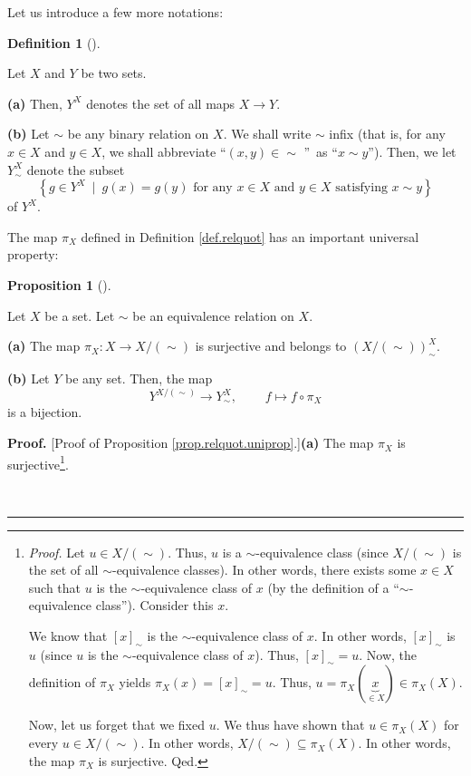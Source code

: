 \documentclass[numbers=enddot,12pt,final,onecolumn,notitlepage]{scrartcl}%
\theoremstyle{definition}
\newtheorem{prop}[theo]{Proposition}
\newenvironment{proposition}[1][]
{\begin{prop}[#1]\begin{leftbar}}
{\end{leftbar}\end{prop}}
\newtheorem{defi}[theo]{Definition}
\newenvironment{definition}[1][]
{\begin{defi}[#1]\begin{leftbar}}
{\end{leftbar}\end{defi}}
\newenvironment{proof}[1][Proof]{\noindent\textbf{#1.} }{\ \rule{0.5em}{0.5em}}
\newenvironment{verlong}{}{}
\begin{document}
\begin{verlong}
Let us introduce a few more notations:

\begin{definition}
\label{def.relquot.maps}Let $X$ and $Y$ be two sets.

\textbf{(a)} Then, $Y^{X}$ denotes the set of all maps $X\rightarrow Y$.

\textbf{(b)} Let $\sim$ be any binary relation on $X$. We shall write $\sim$
infix (that is, for any $x\in X$ and $y\in X$, we shall abbreviate
\textquotedblleft$\left(  x,y\right)  \in\left.  \sim\right.  $%
\textquotedblright\ as \textquotedblleft$x\sim y$\textquotedblright). Then, we
let $Y_{\sim}^{X}$ denote the subset%
\[
\left\{  g\in Y^{X}\ \mid\ g\left(  x\right)  =g\left(  y\right)  \text{ for
any }x\in X\text{ and }y\in X\text{ satisfying }x\sim y\right\}
\]
of $Y^{X}$.
\end{definition}

The map $\pi_{X}$ defined in Definition \ref{def.relquot} has an important
universal property:

\begin{proposition}
\label{prop.relquot.uniprop}Let $X$ be a set. Let $\sim$ be an equivalence
relation on $X$.

\textbf{(a)} The map $\pi_{X}:X\rightarrow X/\left(  \sim\right)  $ is
surjective and belongs to $\left(  X/\left(  \sim\right)  \right)  _{\sim}%
^{X}$.

\textbf{(b)} Let $Y$ be any set. Then, the map%
\[
Y^{X/\left(  \sim\right)  }\rightarrow Y_{\sim}^{X}%
,\ \ \ \ \ \ \ \ \ \ f\mapsto f\circ\pi_{X}%
\]
is a bijection.
\end{proposition}

\begin{proof}
[Proof of Proposition \ref{prop.relquot.uniprop}.]\textbf{(a)} The map
$\pi_{X}$ is surjective\footnote{\textit{Proof.} Let $u\in X/\left(
\sim\right)  $. Thus, $u$ is a $\sim$-equivalence class (since $X/\left(
\sim\right)  $ is the set of all $\sim$-equivalence classes). In other words,
there exists some $x\in X$ such that $u$ is the $\sim$-equivalence class of
$x$ (by the definition of a \textquotedblleft$\sim$-equivalence
class\textquotedblright). Consider this $x$.
\par
We know that $\left[  x\right]  _{\sim}$ is the $\sim$-equivalence class of
$x$. In other words, $\left[  x\right]  _{\sim}$ is $u$ (since $u$ is the
$\sim$-equivalence class of $x$). Thus, $\left[  x\right]  _{\sim}=u$. Now,
the definition of $\pi_{X}$ yields $\pi_{X}\left(  x\right)  =\left[
x\right]  _{\sim}=u$. Thus, $u=\pi_{X}\left(  \underbrace{x}_{\in X}\right)
\in\pi_{X}\left(  X\right)  $.
\par
Now, let us forget that we fixed $u$. We thus have shown that $u\in\pi
_{X}\left(  X\right)  $ for every $u\in X/\left(  \sim\right)  $. In other
words, $X/\left(  \sim\right)  \subseteq\pi_{X}\left(  X\right)  $. In other
words, the map $\pi_{X}$ is surjective. Qed.}.


\end{proof}
\end{verlong}
\end{document}
